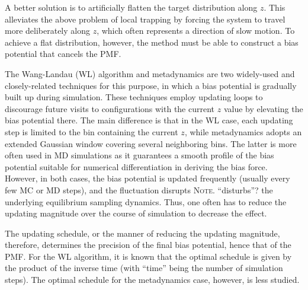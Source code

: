 \documentclass[reprint, floatfix]{revtex4-1}
\newcommand{\note}[1]{{\color{DarkGreen}\footnotesize \textsc{Note.} #1}}
\begin{document}
A better solution is to artificially flatten
the target distribution along $z$\cite{mezei1987, berg1992, lee1993,
wang2001, wang2001pre, laio2002, laio2008, barducci2011, sutto2012}.
%
This alleviates the above problem of local trapping
by forcing the system to travel more
deliberately along $z$,
which often represents
a direction of slow motion.
%
To achieve a flat distribution, however,
the method must be able to construct a
bias potential that cancels the PMF.



The Wang-Landau (WL) algorithm\cite{wang2001, wang2001pre}
and meta\-dy\-nam\-ics\cite{huber1994, laio2002,
laio2008, barducci2011, sutto2012}
are two widely-used and closely-related\cite{micheletti2004}
techniques for this purpose,
in which a bias potential is gradually built up
during simulation.
%
These techniques employ updating loops
to discourage future visits to configurations
with the current $z$ value
by elevating the bias potential there.
%
The main difference
is that in the WL case,
each updating step is limited to the bin
containing the current $z$,
while metadynamics adopts an extended
Gaussian window
covering several neighboring bins.
%
The latter is more often used in MD simulations
as it guarantees a smooth profile
of the bias potential
suitable for numerical differentiation
in deriving the bias force.
%
However, in both cases, the bias potential
is updated frequently (usually every few MC or MD steps),
and the fluctuation
disrupts \note{``disturbs''?} the underlying
equilibrium sampling dynamics\cite{laio2002}.
%
Thus, one often has to reduce
the updating magnitude
over the course of simulation
to decrease the effect.



The updating schedule,
or the manner of reducing
the updating magnitude,
therefore,
determines the precision of the final bias potential,
hence that of the PMF\cite{liang2007,
belardinelli2007, belardinelli2007jcp, belardinelli2008,
morozov2007, zhou2008, morozov2009,
komura2012, caparica2012, caparica2014,
barducci2008, dickson2011, dama2014}.
%
For the WL algorithm, it is known
that the optimal schedule
is given by the product of the
inverse time\cite{liang2007,
belardinelli2007, belardinelli2007jcp, belardinelli2008,
morozov2007, zhou2008}
(with ``time'' being
the number of simulation steps).
%
The optimal schedule for the metadynamics case,
however, is less studied.
\end{document}
